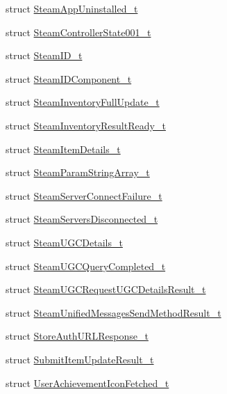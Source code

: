 \begin{DoxyCompactItemize}
\item 
struct \hyperlink{structValve_1_1Steamworks_1_1SteamAppUninstalled__t}{Steam\+App\+Uninstalled\+\_\+t}
\item 
struct \hyperlink{structValve_1_1Steamworks_1_1SteamControllerState001__t}{Steam\+Controller\+State001\+\_\+t}
\item 
struct \hyperlink{structValve_1_1Steamworks_1_1SteamID__t}{Steam\+I\+D\+\_\+t}
\item 
struct \hyperlink{structValve_1_1Steamworks_1_1SteamIDComponent__t}{Steam\+I\+D\+Component\+\_\+t}
\item 
struct \hyperlink{structValve_1_1Steamworks_1_1SteamInventoryFullUpdate__t}{Steam\+Inventory\+Full\+Update\+\_\+t}
\item 
struct \hyperlink{structValve_1_1Steamworks_1_1SteamInventoryResultReady__t}{Steam\+Inventory\+Result\+Ready\+\_\+t}
\item 
struct \hyperlink{structValve_1_1Steamworks_1_1SteamItemDetails__t}{Steam\+Item\+Details\+\_\+t}
\item 
struct \hyperlink{structValve_1_1Steamworks_1_1SteamParamStringArray__t}{Steam\+Param\+String\+Array\+\_\+t}
\item 
struct \hyperlink{structValve_1_1Steamworks_1_1SteamServerConnectFailure__t}{Steam\+Server\+Connect\+Failure\+\_\+t}
\item 
struct \hyperlink{structValve_1_1Steamworks_1_1SteamServersDisconnected__t}{Steam\+Servers\+Disconnected\+\_\+t}
\item 
struct \hyperlink{structValve_1_1Steamworks_1_1SteamUGCDetails__t}{Steam\+U\+G\+C\+Details\+\_\+t}
\item 
struct \hyperlink{structValve_1_1Steamworks_1_1SteamUGCQueryCompleted__t}{Steam\+U\+G\+C\+Query\+Completed\+\_\+t}
\item 
struct \hyperlink{structValve_1_1Steamworks_1_1SteamUGCRequestUGCDetailsResult__t}{Steam\+U\+G\+C\+Request\+U\+G\+C\+Details\+Result\+\_\+t}
\item 
struct \hyperlink{structValve_1_1Steamworks_1_1SteamUnifiedMessagesSendMethodResult__t}{Steam\+Unified\+Messages\+Send\+Method\+Result\+\_\+t}
\item 
struct \hyperlink{structValve_1_1Steamworks_1_1StoreAuthURLResponse__t}{Store\+Auth\+U\+R\+L\+Response\+\_\+t}
\item 
struct \hyperlink{structValve_1_1Steamworks_1_1SubmitItemUpdateResult__t}{Submit\+Item\+Update\+Result\+\_\+t}
\item 
struct \hyperlink{structValve_1_1Steamworks_1_1UserAchievementIconFetched__t}{User\+Achievement\+Icon\+Fetched\+\_\+t}

\end{DoxyCompactItemize}
